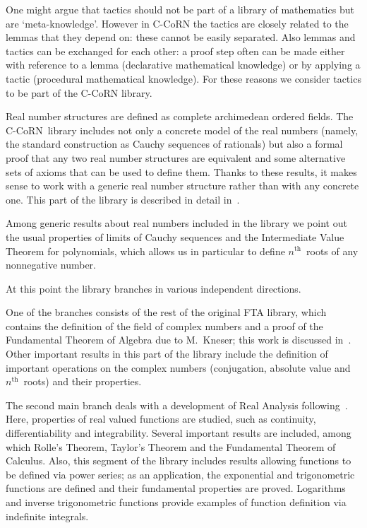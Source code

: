 \documentclass[runningheads]{llncs}
\newcommand{\ccorn}{\mbox{C-CoRN}}
\newcommand{\fta}{FTA}
\newcommand{\nth}{$n^{\mathrm{th}}$}
\begin{document}
One might argue that tactics should not be part of a library of mathematics
but are `meta-knowledge'.
However in {\ccorn} the tactics are closely related to the lemmas
that they depend on: these cannot be easily separated.
Also lemmas and tactics can be exchanged for each other:
a proof step often can be made either with reference to a lemma (declarative
mathematical knowledge)
or by applying a tactic (procedural mathematical knowledge).
For these reasons we consider tactics to be part of the {\ccorn} library.

Real number structures are defined as complete archimedean
ordered fields.
The \ccorn\ library includes not only a concrete model of the real numbers
(namely, the standard construction as Cauchy sequences of rationals) but also
a formal proof that any two real number structures are equivalent and some
alternative sets of axioms that can be used to define them.
Thanks to these results, it makes sense to work with a generic real number
structure rather than with any concrete one.
This part of the library is described in detail in~\cite{niqui2002}.

Among generic results about real numbers included in the library we point out
the usual properties of limits of Cauchy sequences and the Intermediate Value
Theorem for polynomials, which allows us in particular to define \nth\ roots
of any nonnegative number.

At this point the library branches in various independent directions.

One of the branches consists of the rest of the original {\fta} library, which
contains the definition of the field of complex numbers and a proof of the
Fundamental Theorem of Algebra due to M.\ Kneser;
this work is discussed in~\cite{geuvers2001}.
Other important results in this part of the library include the definition
of important operations on the complex numbers (conjugation, absolute value
and \nth\ roots) and their properties.

The second main branch deals with a development of Real Analysis
following~\cite{bishop1967}.
Here, properties of real valued functions are studied, such as continuity,
differentiability and integrability.
Several important results are included, among which Rolle's Theorem, Taylor's
Theorem and the Fundamental Theorem of Calculus.
Also, this segment of the library includes results allowing functions to be
defined via power series; as an application, the exponential and trigonometric
functions are defined and their fundamental properties are proved.
Logarithms and inverse trigonometric functions provide examples of function
definition via indefinite integrals.
\end{document}
